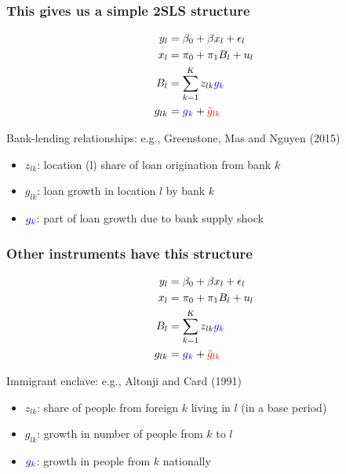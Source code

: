 \documentclass[notes,11pt, aspectratio=169]{beamer}
\begin{document}
\begin{frame}
\frametitle{This gives us a simple 2SLS structure}


\begin{align}
  y_l&= \beta_0 + \beta x_l + \epsilon_l \notag \\
  x_l&= \pi_0 + \pi_{1} B_l + u_l \notag \\  
B_l &=  \sum_{k=1}^{K}z_{lk} \textcolor{blue}{g_{k}} \notag \\
g_{lk} &=   \textcolor{blue}{g}_{ \textcolor{blue}{k}}+  \textcolor{red}{\tilde{g}_{lk}}  \notag 
\end{align}

Bank-lending relationships: e.g., Greenstone, Mas and Nguyen (2015)
\begin{itemize}
\item $z_{lk}$: location (l) share of loan origination from bank $k$
\item $g_{lk}$:  loan growth in location $l$ by bank $k$
\item $\textcolor{blue}{g_k}$: part of loan growth due to bank supply shock
\end{itemize}


\end{frame}




\begin{frame}
\addtocounter{framenumber}{-1}
\frametitle{Other instruments have this structure}

\begin{align}
  y_l&= \beta_0 + \beta x_l + \epsilon_l \notag \\
  x_l&= \pi_0 + \pi_{1} B_l + u_l \notag \\  
B_l &=  \sum_{k=1}^{K}z_{lk} \textcolor{blue}{g_{k}} \notag \\
g_{lk} &=   \textcolor{blue}{g}_{ \textcolor{blue}{k}}+  \textcolor{red}{\tilde{g}_{lk}}  \notag 
\end{align}

Immigrant enclave: e.g., Altonji and Card (1991)
\begin{itemize}
\item $z_{lk}$: share of people from foreign $k$ living in $l$ (in a base period)
\item $g_{lk}$:  growth in number of people from $k$ to $l$
\item $\textcolor{blue}{g_k}$: growth in people from $k$ nationally
\end{itemize}


\end{frame}
\end{document}
